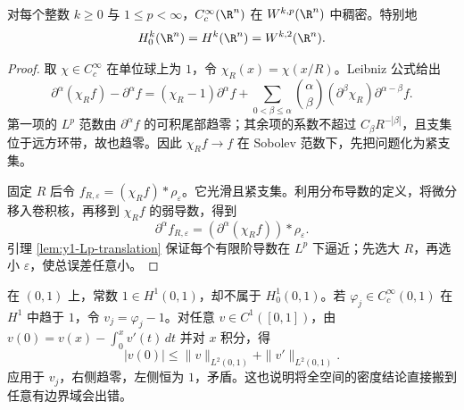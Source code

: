 \begin{theorem}[全空间上的光滑紧支集稠密性]\label{thm:y1-sobolev-density}
对每个整数 $k\ge0$ 与 $1\le p<\infty$，$C_c^\infty(\R^n)$ 在 $W^{k,p}(\R^n)$ 中稠密。特别地
\[
 H_0^k(\R^n)=H^k(\R^n)=W^{k,2}(\R^n).
\]
\end{theorem}
\begin{proof}
取 $\chi\in C_c^\infty$ 在单位球上为 $1$，令 $\chi_R(x)=\chi(x/R)$。Leibniz 公式给出
\[
 \partial^\alpha(\chi_Rf)-\partial^\alpha f
 =(\chi_R-1)\partial^\alpha f
 +\sum_{0<\beta\le\alpha}\binom\alpha\beta
 (\partial^\beta\chi_R)\partial^{\alpha-\beta}f.
\]
第一项的 $L^p$ 范数由 $\partial^\alpha f$ 的可积尾部趋零；其余项的系数不超过 $C_\beta R^{-|\beta|}$，且支集位于远方环带，故也趋零。因此 $\chi_Rf\to f$ 在 Sobolev 范数下，先把问题化为紧支集。

固定 $R$ 后令 $f_{R,\varepsilon}=(\chi_Rf)*\rho_\varepsilon$。它光滑且紧支集。利用分布导数的定义，将微分移入卷积核，再移到 $\chi_Rf$ 的弱导数，得到
\[
 \partial^\alpha f_{R,\varepsilon}
 =(\partial^\alpha(\chi_Rf))*\rho_\varepsilon.
\]
引理 \ref{lem:y1-Lp-translation} 保证每个有限阶导数在 $L^p$ 下逼近；先选大 $R$，再选小 $\varepsilon$，使总误差任意小。
\end{proof}

\begin{example}[补充：在有边界的域中两空间可以不同]
在 $(0,1)$ 上，常数 $1\in H^1(0,1)$，却不属于 $H_0^1(0,1)$。若 $\varphi_j\in C_c^\infty(0,1)$ 在 $H^1$ 中趋于 $1$，令 $v_j=\varphi_j-1$。对任意 $v\in C^1([0,1])$，由 $v(0)=v(x)-\int_0^xv'(t)\,dt$ 并对 $x$ 积分，得
\[
 |v(0)|\le\|v\|_{L^2(0,1)}+\|v'\|_{L^2(0,1)}.
\]
应用于 $v_j$，右侧趋零，左侧恒为 $1$，矛盾。这也说明将全空间的密度结论直接搬到任意有边界域会出错。
\end{example}

